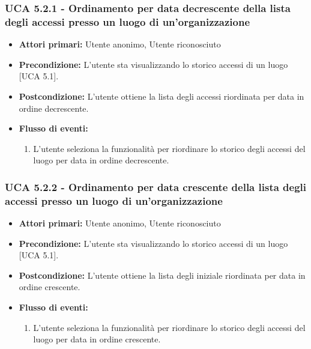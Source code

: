 \subsubsection{UCA 5.2.1 - Ordinamento per data decrescente della lista degli accessi presso un luogo di un'organizzazione}
\begin{itemize}
    \item \textbf{Attori primari:} Utente anonimo, Utente riconosciuto
    \item \textbf{Precondizione:} L'utente sta visualizzando lo storico accessi di un luogo [UCA 5.1].
    \item \textbf{Postcondizione:} L'utente ottiene la lista degli accessi riordinata per data in ordine decrescente.
    \item \textbf{Flusso di eventi:}
    \begin{enumerate}
        \item L'utente seleziona la funzionalità per riordinare lo storico degli accessi del luogo per data in ordine decrescente.
    \end{enumerate}
\end{itemize}

\subsubsection{UCA 5.2.2 - Ordinamento per data crescente della lista degli accessi presso un luogo di un'organizzazione}
\begin{itemize}
    \item \textbf{Attori primari:} Utente anonimo, Utente riconosciuto
    \item \textbf{Precondizione:} L'utente sta visualizzando lo storico accessi di un luogo [UCA 5.1].
    \item \textbf{Postcondizione:} L'utente ottiene la lista degli iniziale riordinata per data in ordine crescente.
    \item \textbf{Flusso di eventi:}
    \begin{enumerate}
        \item L'utente seleziona la funzionalità per riordinare lo storico degli accessi del luogo per data in ordine crescente.
    \end{enumerate}
\end{itemize}

